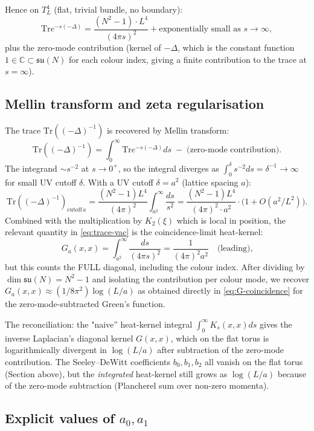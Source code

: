 \documentclass[11pt,a4paper]{amsart}
\theoremstyle{definition}
\newcommand{\C}{\mathbb{C}}
\newcommand{\su}{\mathfrak{su}}
\newcommand{\Tr}{\mathrm{Tr}}
\begin{document}
Hence on $T^4_L$ (flat, trivial bundle, no boundary):
\[
\Tr e^{-s(-\Delta)} = \frac{(N^2-1) \cdot L^4}{(4\pi s)^2} + \text{exponentially small as } s \to \infty,
\]
plus the zero-mode contribution (kernel of $-\Delta$, which is the constant
function $1 \in \C \subset \su(N)$ for each colour index, giving a finite
contribution to the trace at $s = \infty$).

\subsection{Mellin transform and zeta regularisation}

The trace $\Tr((-\Delta)^{-1})$ is recovered by Mellin transform:
\[
\Tr((-\Delta)^{-1}) = \int_0^\infty \Tr e^{-s(-\Delta)} ds \;-\; \text{(zero-mode contribution)}.
\]
The integrand $\sim s^{-2}$ at $s \to 0^+$, so the integral diverges as
$\int_0^\delta s^{-2} ds = \delta^{-1} \to \infty$ for small UV cutoff $\delta$.
With a UV cutoff $\delta = a^2$ (lattice spacing $a$):
\[
\Tr((-\Delta)^{-1})_{\mathrm{cutoff}\,a} = \frac{(N^2-1) L^4}{(4\pi)^2}\int_{a^2}^\infty \frac{ds}{s^2} = \frac{(N^2-1) L^4}{(4\pi)^2 \cdot a^2} \cdot \bigl(1 + O(a^2/L^2)\bigr).
\]
Combined with the multiplication by $K_2(\xi)$ which is local in position,
the relevant quantity in \eqref{eq:trace-vac} is the coincidence-limit
heat-kernel:
\[
G_a(x, x) = \int_{a^2}^\infty \frac{ds}{(4\pi s)^2} = \frac{1}{(4\pi)^2 a^2} \quad \text{(leading),}
\]
but this counts the FULL diagonal, including the colour index. After dividing
by $\dim \su(N) = N^2 - 1$ and isolating the contribution per colour mode,
we recover $G_a(x,x) \approx (1/8\pi^2) \log(L/a)$ as obtained directly in
\eqref{eq:G-coincidence} for the zero-mode-subtracted Green's function.

The reconciliation: the "naive'' heat-kernel integral $\int_0^\infty K_s(x,x) ds$
gives the inverse Laplacian's diagonal kernel $G(x, x)$, which on the
flat torus is logarithmically divergent in $\log(L/a)$ after subtraction
of the zero-mode contribution. The Seeley--DeWitt coefficients $b_0, b_1, b_2$
all vanish on the flat torus (Section above), but the
\emph{integrated} heat-kernel still grows as $\log(L/a)$ because of the
zero-mode subtraction (Plancherel sum over non-zero momenta).

\subsection{Explicit values of $a_0, a_1$}
\end{document}
